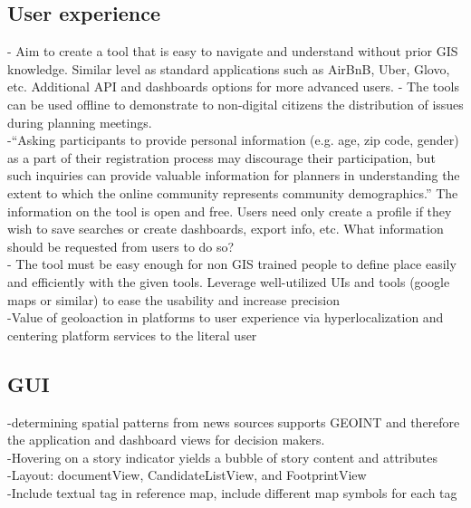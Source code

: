 \subsection{User experience}
-{\color{purple} Aim to create a tool that is easy to navigate and understand without prior GIS knowledge. Similar level as standard applications such as AirBnB, Uber, Glovo, etc.  Additional API and dashboards options for more advanced users.} \cite{Evans-Cowley2010}
-{\color{purple}  The tools can be used offline to demonstrate to non-digital citizens the distribution of issues during planning meetings.} \cite{Evans-Cowley2010}\\
-{\color{orange}“Asking participants to provide personal information (e.g. age, zip code, gender) as a part of their registration process may discourage their participation, but such inquiries can provide valuable information for planners in understanding the extent to which the online community represents community demographics.”}\cite{Afzalan2017} {\color{purple} The information on the tool is open and free.  Users need only create a profile if they wish to save searches or create dashboards, export info, etc.  What information should be requested from users to do so?}\cite{Afzalan2017}\\
-{\color{purple} The tool must be easy enough for non GIS trained people to define place easily and efficiently with the given tools. Leverage well-utilized UIs and tools (google maps or similar) to ease the usability and increase precision\cite{Brown2012}}\\
-{\color{purple}Value of geoloaction in platforms to user experience via hyperlocalization and centering platform services to the literal user \cite{Leszczynski2019}}\\

\subsection{GUI}
-{\color{purple}determining spatial patterns from news sources supports GEOINT and therefore the application and dashboard views for decision makers.\cite{Imani2019}}\\
-{\color{orange}Hovering on a story indicator yields a bubble of story content and attributes\cite{Teitler2008}}\\
-{\color{orange}Layout: documentView, CandidateListView, and FootprintView\cite{Cai2016}}\\
-{\color{red}Include textual tag in reference map, include different map symbols for each tag\cite{Karimzadeh2019}}\\

